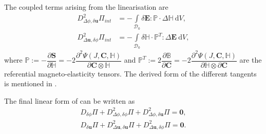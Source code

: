 The coupled terms arising from the linearisation are
\begin{align}
D^2_{\Delta \phi, \delta \mathbf{u}} \Pi_{int} &= - \int\limits_{\mathcal{D}_0} \delta \mathbf{E} : \mathbb{P} \cdot \Delta \mathbb{H} \ \mathrm{d}V, \label{eq:3.31.1} \\
D^2_{\Delta \mathbf{u}, \delta \phi} \Pi_{int} &= - \int\limits_{\mathcal{D}_0} \delta \mathbb{H} \cdot \mathbb{P}^T : \Delta \mathbf{E} \ \mathrm{d}V, \label{eq:3.31.2}
\end{align}
where $\mathbb{P} := -\dfrac{\partial \mathbf{S}}{\partial \mathbb{H}} = -2 \dfrac{\partial^2 \Psi (J, \mathbf{C}, \mathbb{H})}{\partial \mathbf{C} \otimes \mathbb{H}}$ and $\mathbb{P}^T := 2 \dfrac{\partial \mathbb{B}}{\partial \mathbf{C}} = -2 \dfrac{\partial^2 \Psi (J, \mathbf{C}, \mathbb{H})}{\partial \mathbb{H} \otimes \partial \mathbf{C}}$ are the referential magneto-elasticity tensors. The derived form of the different tangents is mentioned in . \par 

The final linear form of  can be written as
\begin{align}
D_{\delta \phi} \Pi + D^2_{\Delta \phi, \delta \phi} \Pi + D^2_{\Delta \phi, \delta \mathbf{u}} \Pi = \mathbf{0}, \nonumber \\
D_{\delta \mathbf{u}} \Pi + D^2_{\Delta \mathbf{u}, \delta \mathbf{u}} \Pi + D^2_{\Delta \mathbf{u}, \delta \phi} \Pi = \mathbf{0}.
\label{eq:3.35}
\end{align}
 
